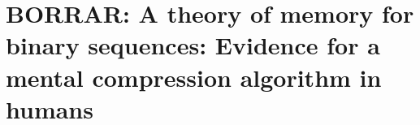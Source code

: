 \chapter{BORRAR: A theory of memory for binary sequences: Evidence for a mental compression algorithm in humans}


